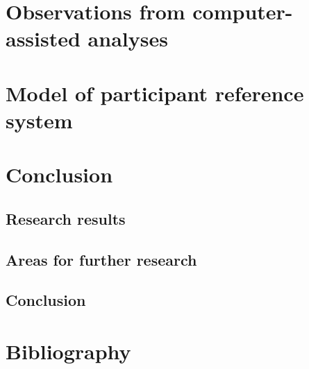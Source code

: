 \documentclass[twoside,a4paper,10pt]{article}
\begin{document}
\section{Observations from computer-assisted analyses}
\section{Model of participant reference system}
\newpage
\section{Conclusion}
\subsection{Research results}
\subsection{Areas for further research}
\subsection{Conclusion}
\newpage
\section*{Bibliography}
\printbibliography
\end{document}
